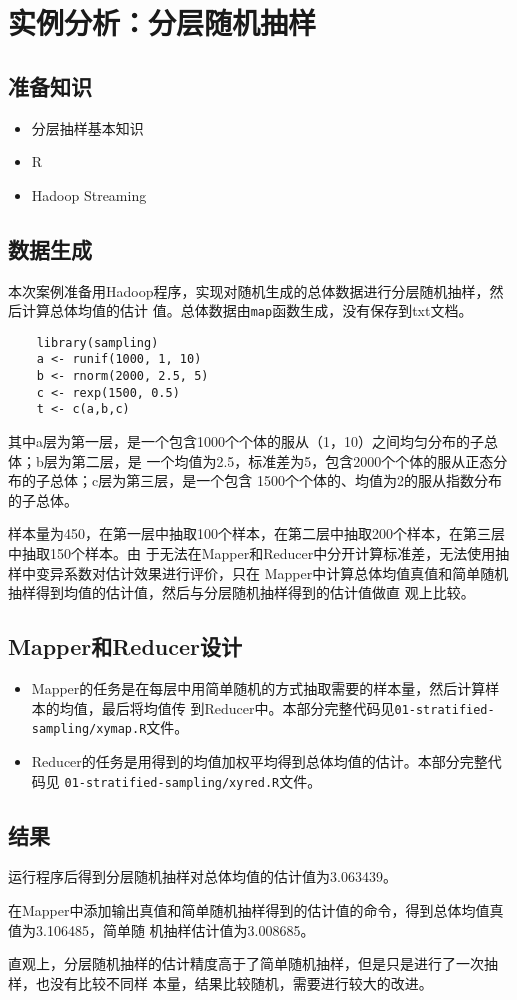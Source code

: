 \section{实例分析：分层随机抽样}\label{ux5b9eux4f8bux5206ux6790ux5206ux5c42ux968fux673aux62bdux6837}

\subsection{准备知识}\label{ux51c6ux5907ux77e5ux8bc6}

\begin{itemize}
\itemsep1pt\parskip0pt
\item
  分层抽样基本知识
\item
  R
\item
  Hadoop Streaming
\end{itemize}

\subsection{数据生成}\label{ux6570ux636eux751fux6210}

本次案例准备用Hadoop程序，实现对随机生成的总体数据进行分层随机抽样，然后计算总体均值的估计
值。总体数据由\lstinline|map|函数生成，没有保存到txt文档。

\begin{lstlisting}
	library(sampling)
	a <- runif(1000, 1, 10)
	b <- rnorm(2000, 2.5, 5)
	c <- rexp(1500, 0.5)
	t <- c(a,b,c)
\end{lstlisting}

其中a层为第一层，是一个包含1000个个体的服从（1，10）之间均匀分布的子总体；b层为第二层，是
一个均值为2.5，标准差为5，包含2000个个体的服从正态分布的子总体；c层为第三层，是一个包含
1500个个体的、均值为2的服从指数分布的子总体。

样本量为450，在第一层中抽取100个样本，在第二层中抽取200个样本，在第三层中抽取150个样本。由
于无法在Mapper和Reducer中分开计算标准差，无法使用抽样中变异系数对估计效果进行评价，只在
Mapper中计算总体均值真值和简单随机抽样得到均值的估计值，然后与分层随机抽样得到的估计值做直
观上比较。

\subsection{Mapper和Reducer设计}\label{mapperux548creducerux8bbeux8ba1}

\begin{itemize}
\item
  Mapper的任务是在每层中用简单随机的方式抽取需要的样本量，然后计算样本的均值，最后将均值传
  到Reducer中。本部分完整代码见\lstinline!01-stratified-sampling/xymap.R!文件。
\item
  Reducer的任务是用得到的均值加权平均得到总体均值的估计。本部分完整代码见
  \lstinline!01-stratified-sampling/xyred.R!文件。
\end{itemize}

\subsection{结果}\label{ux7ed3ux679c}

运行程序后得到分层随机抽样对总体均值的估计值为3.063439。

在Mapper中添加输出真值和简单随机抽样得到的估计值的命令，得到总体均值真值为3.106485，简单随
机抽样估计值为3.008685。

直观上，分层随机抽样的估计精度高于了简单随机抽样，但是只是进行了一次抽样，也没有比较不同样
本量，结果比较随机，需要进行较大的改进。

